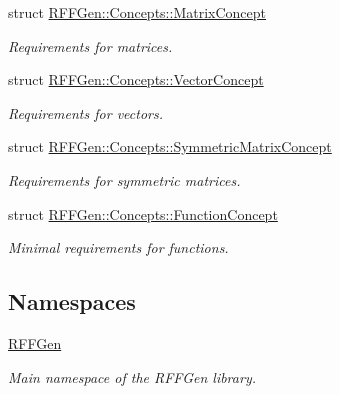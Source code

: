 \begin{DoxyCompactItemize}
struct \hyperlink{structRFFGen_1_1Concepts_1_1MatrixConcept}{R\-F\-F\-Gen\-::\-Concepts\-::\-Matrix\-Concept}
\begin{DoxyCompactList}\small\item\em Requirements for matrices. \end{DoxyCompactList}\item 
struct \hyperlink{structRFFGen_1_1Concepts_1_1VectorConcept}{R\-F\-F\-Gen\-::\-Concepts\-::\-Vector\-Concept}
\begin{DoxyCompactList}\small\item\em Requirements for vectors. \end{DoxyCompactList}\item 
struct \hyperlink{structRFFGen_1_1Concepts_1_1SymmetricMatrixConcept}{R\-F\-F\-Gen\-::\-Concepts\-::\-Symmetric\-Matrix\-Concept}
\begin{DoxyCompactList}\small\item\em Requirements for symmetric matrices. \end{DoxyCompactList}\item 
struct \hyperlink{structRFFGen_1_1Concepts_1_1FunctionConcept}{R\-F\-F\-Gen\-::\-Concepts\-::\-Function\-Concept}
\begin{DoxyCompactList}\small\item\em Minimal requirements for functions. \end{DoxyCompactList}\end{DoxyCompactItemize}
\subsection*{Namespaces}
\begin{DoxyCompactItemize}
\item 
\hyperlink{namespaceRFFGen}{R\-F\-F\-Gen}
\begin{DoxyCompactList}\small\item\em Main namespace of the R\-F\-F\-Gen library. \end{DoxyCompactList}\end{DoxyCompactItemize}
